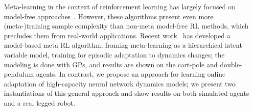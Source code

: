 Meta-learning in the context of reinforcement learning has largely focused on model-free approaches~\citep{duan2016rl2,wang2016learning,sung2017learning,al2017cont}. However, these algorithms present even more (meta-)training sample complexity than non-meta model-free RL methods, which precludes them from real-world applications. Recent work~\citep{saemundsson2018meta}  has developed a model-based meta RL algorithm, framing meta-learning as a hierarchical latent variable model, training for episodic adaptation to dynamics changes; the modeling is done with GPs, and results are shown on the cart-pole and double-pendulum agents. In contrast, we propose an approach for learning online adaptation of high-capacity neural network dynamics models; we present two instantiations of this general approach and show results on both simulated agents and a real legged robot.